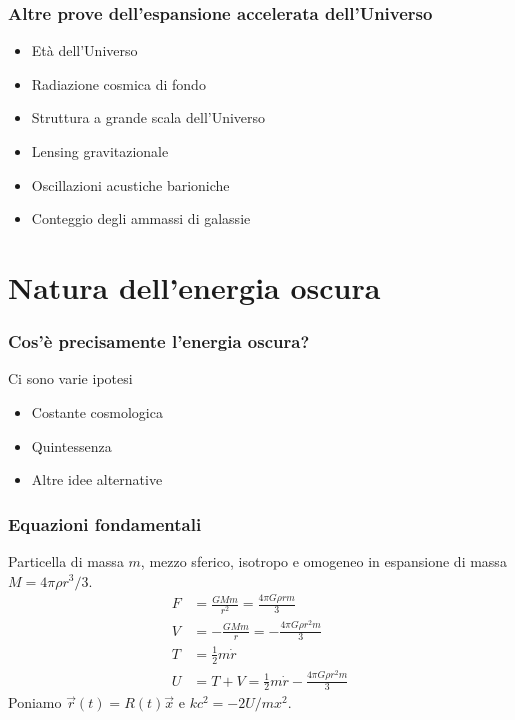 \begin{frame}
  \frametitle{Altre prove dell'espansione accelerata dell'Universo}
  \begin{itemize}
  \item Età dell'Universo
  \item Radiazione cosmica di fondo
  \item Struttura a grande scala dell'Universo
  \item Lensing gravitazionale
  \item Oscillazioni acustiche barioniche
  \item Conteggio degli ammassi di galassie
  \end{itemize}
\end{frame}

\section[Natura]{Natura dell'energia oscura}

\begin{frame}
  \frametitle{Cos'è precisamente l'energia oscura?}
  Ci sono varie ipotesi
  \begin{itemize}
  \item Costante cosmologica
  \item Quintessenza
  \item Altre idee alternative
  \end{itemize}
\end{frame}

\begin{frame}
  \frametitle[]{Equazioni fondamentali}
  Particella di massa $m$, mezzo sferico, \alert{isotropo e omogeneo} in
  espansione di massa $M = 4\pi\rho r^3/3$.
  \begin{align*}
    F &= \frac{GMm}{r^2} = \frac{4\pi G \rho r m}{3} \\
    V &= -\frac{GMm}{r} = -\frac{4\pi G \rho r^2 m}{3} \\
    T &= \frac{1}{2}m\dot{r} \\
    U &= T + V = \frac{1}{2}m\dot{r} - \frac{4\pi G \rho r^2 m}{3}
  \end{align*}
  Poniamo $\vec{r}(t) = R(t)\vec{x}$ e $kc^2 = -2U/mx^2$.
\end{frame}

